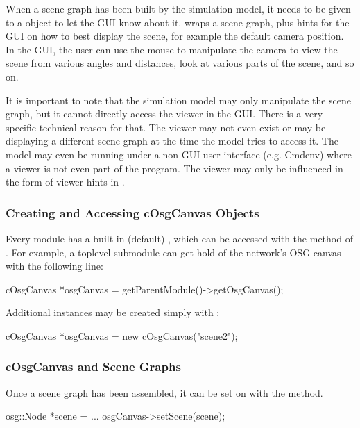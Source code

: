 When a scene graph has been built by the simulation model, it needs to be
given to a  object to let the {\opp} GUI know about it.
 wraps a scene graph, plus hints for the GUI on how to
best display the scene, for example the default camera position. In the
GUI, the user can use the mouse to manipulate the camera to view the scene
from various angles and distances, look at various parts of the scene,
and so on.

It is important to note that the simulation model may only
manipulate the scene graph, but it cannot directly access the viewer
in the GUI. There is a very specific technical reason for that.
The viewer may not even exist or may be displaying a different
scene graph at the time the model tries to access it. The model
may even be running under a non-GUI user interface (e.g. Cmdenv)
where a viewer is not even part of the program. The viewer may
only be influenced in the form of viewer hints in
.


\subsubsection{Creating and Accessing cOsgCanvas Objects}

Every module has a built-in (default) , which can be
accessed with the  method of .
For example, a toplevel submodule can get hold of the network's
OSG canvas with the following line:

\begin{cpp}
cOsgCanvas *osgCanvas = getParentModule()->getOsgCanvas();
\end{cpp}

Additional  instances may be created simply with :

\begin{cpp}
cOsgCanvas *osgCanvas = new cOsgCanvas("scene2");
\end{cpp}

\subsubsection{cOsgCanvas and Scene Graphs}

Once a scene graph has been assembled, it can be set on 
with the  method.

\begin{cpp}
osg::Node *scene = ...
osgCanvas->setScene(scene);
\end{cpp}

